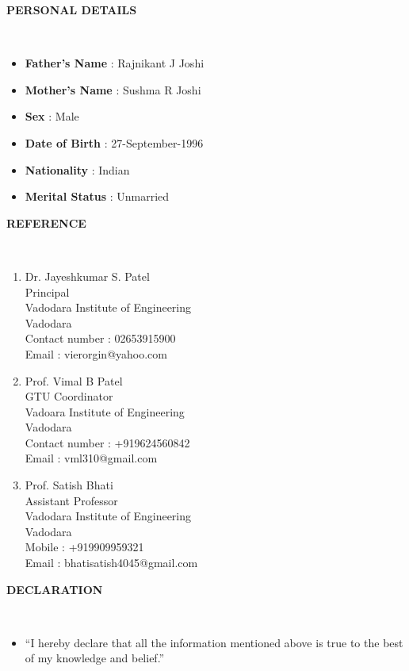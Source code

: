 \documentclass[a4paper,10pt]{article}
\newcommand{\lsep}{-0.5cm}
\newcommand{\resheading}[1]{{\small \colorbox{mygrey}{\begin{minipage}{0.975\textwidth}{\textbf{#1 \vphantom{p\^{E}}}}\end{minipage}}}}
\begin{document}
\resheading{\textbf{\Large{PERSONAL DETAILS}}}\\[\lsep]
\begin{itemize}
\item {\textbf{Father's Name}} : Rajnikant J Joshi
\item {\textbf{Mother's Name}} : Sushma R Joshi
\item {\textbf{Sex}} : Male
\item {\textbf{Date of Birth}} : 27-September-1996
\item {\textbf{Nationality}} : Indian
\item {\textbf{Merital Status}} : Unmarried
\end{itemize}

\resheading{\textbf{\Large{REFERENCE}}}\\[\lsep]
\begin{enumerate}
    \item \noindent Dr. Jayeshkumar S. Patel\\
     Principal\\
     Vadodara Institute of Engineering\\
     Vadodara\\
     Contact number : 02653915900\\
     Email : vierorgin@yahoo.com\\
     
     \item \noindent Prof. Vimal B Patel\\
     GTU Coordinator\\
     Vadoara Institute of Engineering\\
     Vadodara\\
     Contact number : +919624560842\\
     Email : vml310@gmail.com
     
    \item \noindent Prof. Satish Bhati\\
    Assistant Professor\\
    Vadodara Institute of Engineering\\
    Vadodara\\
    Mobile : +919909959321\\
    Email : bhatisatish4045@gmail.com
\end{enumerate}

\resheading{\textbf{\Large{DECLARATION}}}\\[\lsep]
\begin{itemize}
\item \noindent “I hereby declare that all the information mentioned above is true to the best of my knowledge and belief.”
\end{itemize}
\end{document}
